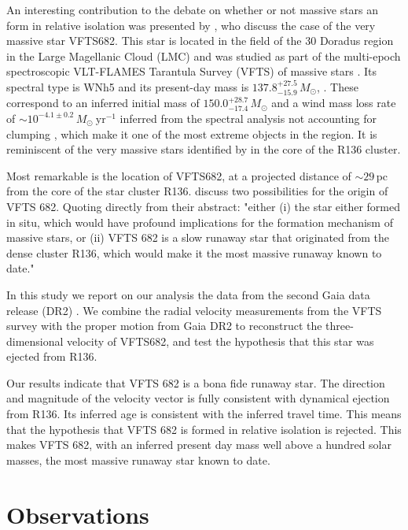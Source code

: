 \documentclass[apjl,twocolumn]{emulateapj}
\begin{document}
An interesting contribution to the debate on whether or not massive
stars an form in relative isolation was presented by
\cite{bestenlehner:11, bressert:12}, who discuss the case of the very massive star
VFTS682.   This star is located in the field of the 30 Doradus region
in the Large Magellanic Cloud (LMC) and was studied as part of the
multi-epoch spectroscopic VLT-FLAMES Tarantula Survey (VFTS) of
massive stars \citep{evans:11}.  Its spectral type is WNh5 and its 
present-day mass is $137.8^{+27.5}_{-15.9}\,M_\odot$,
\citep{schneider:18}. These correspond to an inferred initial mass of
$150.0^{+28.7}_{-17.4}\,M_\odot$ and a wind mass loss rate of
$\sim10^{-4.1\pm0.2}\,M_\odot \ \mathrm{yr}^{-1}$ inferred from the
spectral analysis not accounting for clumping
\citep[][]{bestenlehner:11}, which make it one of the
most extreme objects in the region.  It is reminiscent of the very
massive stars %
identified by
\citet{crowther:10, crowther:16} in the core of the
R136 cluster. 
 
Most remarkable is the location of VFTS682, at a projected distance of
$\sim$$29$\,pc from the core of the star cluster
R136. \citet{bestenlehner:11} discuss two possibilities for the
origin of VFTS 682. Quoting directly from their abstract: "either (i) the star either formed in situ, which would have profound implications for the formation mechanism of massive stars, or (ii) VFTS 682 is a slow runaway star that originated from the dense cluster R136, which would make it the most massive runaway known to date."

In this study we report on our analysis the data from the second Gaia data release (DR2) \cite[][]{gaia:16,brown:18}.  We combine the radial velocity measurements from the VFTS survey \citep[][]{evans:11} with the proper motion from Gaia DR2 to reconstruct the three-dimensional velocity of VFTS682, and test the hypothesis that this star was ejected from R136. 

Our results indicate that VFTS 682 is a bona fide runaway star.  The direction and magnitude of the velocity vector is fully consistent with dynamical ejection from R136.  Its inferred age is consistent with the inferred travel time. This means that the hypothesis that VFTS 682 is formed in relative isolation is rejected.  This makes VFTS 682, with an inferred present day mass well above a hundred solar masses, the most massive runaway star known to date. 


\section{Observations}
\label{sec:sample}
\end{document}
